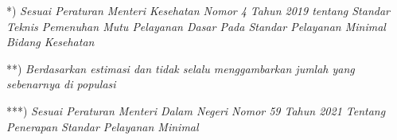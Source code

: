 {*}) \emph{Sesuai Peraturan Menteri Kesehatan Nomor 4 Tahun 2019 tentang Standar Teknis Pemenuhan Mutu Pelayanan Dasar Pada Standar Pelayanan
Minimal Bidang Kesehatan}

{**}) \emph{Berdasarkan estimasi dan tidak selalu menggambarkan jumlah yang sebenarnya di populasi}

{***}) \emph{Sesuai Peraturan Menteri Dalam Negeri Nomor 59 Tahun 2021 Tentang Penerapan Standar Pelayanan Minimal}